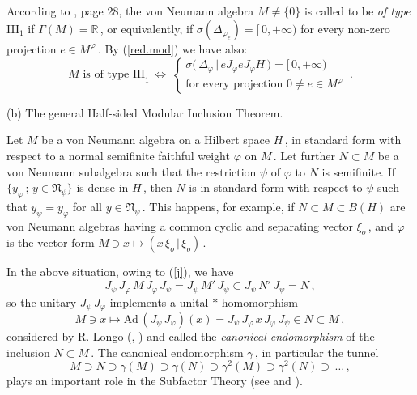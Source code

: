 \documentclass[reqno]{amsart}
\theoremstyle{definition}
\theoremstyle{remark}
\numberwithin{equation}{section}
\theoremstyle{plain}
\begin{document}
According to \cite{Co}, page 28, the von Neumann algebra $M\neq
\{ 0\}$ is called to be \emph{of type} III$_1$ if $\Gamma (M) =
\mathbb R\,$, or equivalently, if $\sigma (\Delta_{\varphi_e})=
[\, 0,+\infty )$ for every non-zero projection $e\in M^\varphi\,$.
By (\ref{red.mod}) we have also:
\begin{equation}\label{typeIII_1}
M\text{ is of type III}_1\,\Longleftrightarrow\,
\left\{ \begin{array}{l} \sigma \big(\,\Delta_\varphi\, |\,
e J_\varphi e J_\varphi H\,\big) = [\, 0,+\infty ) \\
\text{for every projection }0\neq e\in M^\varphi
\end{array}\, . \right.
\end{equation}

\bigskip
\noindent (b) {\sc The general Half-sided Modular Inclusion Theorem}.
\bigskip

Let $M$ be a von Neumann algebra on a Hilbert space $H\,$, in
standard form with respect to a normal semifinite faithful weight
$\varphi$ on $M\,$. Let further $N\subset M$ be a von Neumann
subalgebra such that the restriction $\psi$ of $\varphi$ to $N$ is
semifinite. If $\{ y_\varphi\, ;\, y\in\mathfrak N_\psi\}$ is dense
in $H\,$, then $N$ is in standard form with respect to $\psi$ such
that $y_\psi =y_\varphi$ for all $y\in\mathfrak N_\psi\,$.
This happens, for example, if $N\subset M\subset B(H)$ are von
Neumann algebras having a common cyclic and separating vector
$\xi_o\,$, and $\varphi$ is the vector form $M\ni x\longmapsto
(x\,\xi_o\, |\,\xi_o )\,$.

In the above situation, owing to (\ref{j}), we have
\begin{equation*}
J_\psi\, J_\varphi\, M\, J_\varphi\, J_\psi =J_\psi\, M'\, J_\psi
\subset J_\psi\, N'\, J_\psi =N\, ,
\end{equation*}
so the unitary $J_\psi\, J_\varphi$ implements a unital
$*$-homomorphism
\begin{equation*}
M\ni x\longmapsto \text{Ad}\, (J_\psi\, J_\varphi)(x)=J_\psi\,
J_\varphi\, x\, J_\varphi\, J_\psi\in N\subset M\, ,
\end{equation*}
considered by R. Longo (\cite{Lo1}, \cite{Lo2}) and called the
\emph{canonical endomorphism} of the inclusion $N\subset M\,$. The
canonical endomorphism $\gamma\,$, in particular the tunnel
\begin{equation}\label{tunnel}
M\supset N\supset \gamma (M)\supset \gamma (N)\supset \gamma^2 (M)
\supset \gamma^2(N)\supset\,\ldots\, ,
\end{equation}
plays an important role in the Subfactor Theory (see \cite{Lo3}
and \cite{Kos}).
\end{document}
